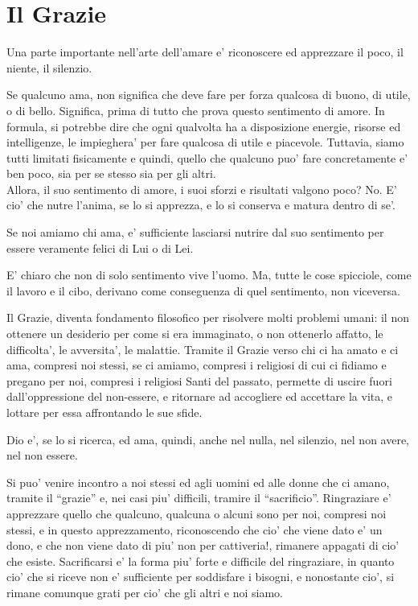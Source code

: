 \section{Il Grazie}

Una parte importante nell'arte dell'amare e' riconoscere ed apprezzare il poco, il niente, il silenzio.

Se qualcuno ama, non significa che deve fare per forza qualcosa di buono, di utile, o di bello. Significa, prima di tutto che prova questo sentimento di amore. In formula, si potrebbe dire che ogni qualvolta ha a disposizione energie, risorse ed intelligenze, le impieghera' per fare qualcosa di utile e piacevole. Tuttavia, siamo tutti limitati fisicamente e quindi, quello che qualcuno puo' fare concretamente e' ben poco, sia per se stesso sia per gli altri.\\
Allora, il suo sentimento di amore, i suoi sforzi e risultati valgono poco? No. E' cio' che nutre l'anima, se lo si apprezza, e lo si conserva e matura dentro di se'.

Se noi amiamo chi ama, e' sufficiente lasciarsi nutrire dal suo sentimento per essere veramente felici di Lui o di Lei.

E' chiaro che non di solo sentimento vive l'uomo. Ma, tutte le cose spicciole, come il lavoro e il cibo, derivano come conseguenza di quel sentimento, non viceversa.

Il Grazie, diventa fondamento filosofico per risolvere molti problemi umani: il non ottenere un desiderio per come si era immaginato, o non ottenerlo affatto, le difficolta', le avversita', le malattie. Tramite il Grazie verso chi ci ha amato e ci ama, compresi noi stessi, se ci amiamo, compresi i religiosi di cui ci fidiamo e pregano per noi, compresi i religiosi Santi del passato, permette di uscire fuori dall'oppressione del non-essere, e ritornare ad accogliere ed accettare la vita, e lottare per essa affrontando le sue sfide.

Dio e', se lo si ricerca, ed ama, quindi, anche nel nulla, nel silenzio, nel non avere, nel non essere. 

Si puo' venire incontro a noi stessi ed agli uomini ed alle donne che ci amano, tramite il ``grazie'' e, nei casi piu' difficili, tramire il ``sacrificio''. Ringraziare e' apprezzare quello che qualcuno, qualcuna o alcuni sono per noi, compresi noi stessi, e in questo apprezzamento, riconoscendo che cio' che viene dato e' un dono, e che non viene dato di piu' non per cattiveria!, rimanere appagati di cio' che esiste. Sacrificarsi e' la forma piu' forte e difficile del ringraziare, in quanto cio' che si riceve non e' sufficiente per soddisfare i bisogni, e nonostante cio', si rimane comunque grati per cio' che gli altri e noi siamo. 

